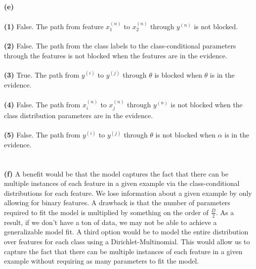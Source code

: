 \documentclass[submit]{harvardml}
\begin{document}
\textbf{(e)}\\\\
\textbf{(1)} False. The path from feature $x_1^{(n)}$ to $x_2^{(n)}$ through $y^{(n)}$ is not blocked.\\\\
\textbf{(2)} False. The path from the class labels to the class-conditional parameters through the features is not blocked when the features are in the evidence.\\\\
\textbf{(3)} True. The path from $y^{(i)}$ to $y^{(j)}$ through $\theta$ is blocked when $\theta$ is in the evidence.\\\\
\textbf{(4)} False. The path from $x_i^{(n)}$ to $x_j^{(n)}$ through $y^{(n)}$ is not blocked when the class distribution parameters are in the evidence.\\\\
\textbf{(5)} False. The path from $y^{(i)}$ to $y^{(j)}$ through $\theta$ is not blocked when $\alpha$ is in the evidence.\\\\\\

\textbf{(f)} A benefit would be that the model captures the fact that there can be multiple instances of each feature in a given example via the class-conditional distributions for each feature. We lose information about a given example by only allowing for binary features. A drawback is that the number of parameters required to fit the model is multiplied by something on the order of $\frac{D}{2}$. As a result, if we don't have a ton of data, we may not be able to achieve a generalizable model fit. A third option would be to model the entire distribution over features for each class using a Dirichlet-Multinomial. This would allow us to capture the fact that there can be multiple instances of each feature in a given example without requiring as many parameters to fit the model.
\end{document}
